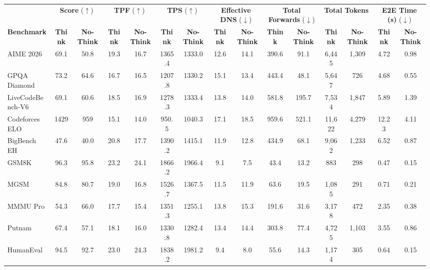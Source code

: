 \documentclass[11pt, a4paper, logo, copyright, gdm]{google}
\begin{document}
\begin{landscape}
\begin{table}[t!]
\centering
\small
\setlength{\tabcolsep}{2.5pt}
\begin{tabular}{l|cc|cc|cc|cc|cc|cc|cc}
\toprule
 & \multicolumn{2}{c}{\textbf{Score} ($\uparrow$)} & \multicolumn{2}{c}{\textbf{TPF} ($\uparrow$)} & \multicolumn{2}{c}{\textbf{TPS} ($\uparrow$)} & \multicolumn{2}{c}{\textbf{Effective DNS} ($\downarrow$)} & \multicolumn{2}{c}{\textbf{Total Forwards} ($\downarrow$)} & \multicolumn{2}{c}{\textbf{Total Tokens}} & \multicolumn{2}{c}{\textbf{E2E Time (s)} ($\downarrow$)} \\
\cmidrule(lr){2-3} \cmidrule(lr){4-5} \cmidrule(lr){6-7} \cmidrule(lr){8-9} \cmidrule(lr){10-11} \cmidrule(lr){12-13} \cmidrule(lr){14-15}
\textbf{Benchmark} & \textbf{Think} & \textbf{No-Think} & \textbf{Think} & \textbf{No-Think} & \textbf{Think} & \textbf{No-Think} & \textbf{Think} & \textbf{No-Think} & \textbf{Think} & \textbf{No-Think} & \textbf{Think} & \textbf{No-Think} & \textbf{Think} & \textbf{No-Think} \\
\midrule
AIME 2026 & 69.1 & 50.8 & 19.3 & 16.7 & 1365.4 & 1333.0 & 12.6 & 14.1 & 390.6 & 91.1 & 6,445 & 1,309 & 4.72 & 0.98 \\
GPQA Diamond & 73.2 & 64.6 & 16.7 & 16.5 & 1207.8 & 1330.2 & 15.1 & 13.4 & 443.4 & 48.1 & 5,647 & 726 & 4.68 & 0.55 \\
LiveCodeBench-V6 & 69.1 & 60.6 & 18.5 & 16.9 & 1278.3 & 1333.4 & 13.8 & 14.0 & 581.8 & 195.7 & 7,534 & 1,847 & 5.89 & 1.39 \\
Codeforces ELO & 1429 & 959 & 15.1 & 14.0 & 950.5 & 1040.3 & 17.1 & 18.5 & 959.6 & 521.1 & 11,622 & 4,279 & 12.23 & 4.11 \\
BigBench EH & 47.6 & 40.0 & 20.8 & 17.7 & 1390.2 & 1415.1 & 11.9 & 12.8 & 434.9 & 68.1 & 9,062 & 1,233 & 6.52 & 0.87 \\
GSM8K & 96.3 & 95.8 & 23.2 & 24.1 & 1866.2 & 1966.4 & 9.1 & 7.5 & 43.4 & 13.2 & 883 & 298 & 0.47 & 0.15 \\
MGSM & 84.8 & 80.7 & 19.0 & 16.8 & 1526.7 & 1367.5 & 11.5 & 11.9 & 63.6 & 19.5 & 1,085 & 291 & 0.71 & 0.21 \\
MMMU Pro & 54.3 & 66.0 & 17.7 & 15.4 & 1351.3 & 1255.1 & 13.8 & 15.3 & 191.6 & 31.6 & 3,178 & 472 & 2.35 & 0.38 \\
Putnam & 67.4 & 57.1 & 18.1 & 16.0 & 1330.8 & 1282.4 & 13.4 & 14.4 & 303.8 & 77.4 & 4,725 & 1,103 & 3.55 & 0.86 \\
HumanEval & 94.5 & 92.7 & 23.0 & 24.3 & 1838.2 & 1981.2 & 9.4 & 8.0 & 55.6 & 14.3 & 1,174 & 305 & 0.64 & 0.15 \\

\end{tabular}
\end{table}
\end{landscape}
\end{document}
